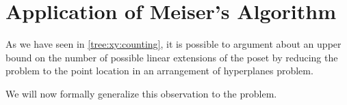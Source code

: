 \chapter{Application of Meiser's Algorithm}

As we have seen in \ref{tree:xy:counting}, it is possible to argument about an upper
bound on the number of possible linear extensions of the poset \XY by
reducing the problem to the point location in an
arrangement of hyperplanes problem.

We will now formally generalize this observation to the \kSUM problem.
